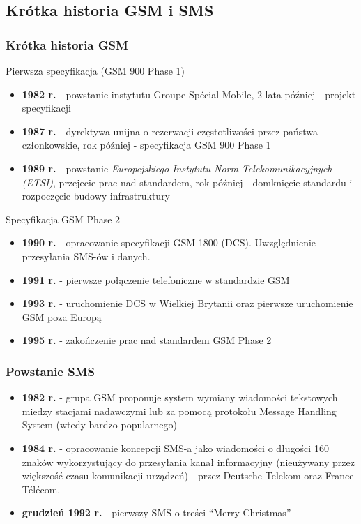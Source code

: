 \documentclass[xcolor=table]{beamer}
\begin{document}
\subsection{Krótka historia GSM i SMS}
\begin{frame}[allowframebreaks]
  \frametitle{Krótka historia GSM}

  Pierwsza specyfikacja (GSM 900 Phase 1)
  \begin{itemize}
    \item \textbf{1982 r.} - powstanie instytutu Groupe Spécial Mobile, 2 lata
      później - projekt specyfikacji
    \item \textbf{1987 r.} - dyrektywa unijna o rezerwacji częstotliwości przez
      państwa członkowskie, rok później - specyfikacja GSM 900 Phase 1
    \item \textbf{1989 r.} - powstanie \emph{Europejskiego Instytutu Norm
      Telekomunikacyjnych (ETSI)}, przejecie prac nad standardem, rok później -
      domknięcie standardu i rozpoczęcie budowy infrastruktury
  \end{itemize}

  \framebreak

  Specyfikacja GSM Phase 2
  \begin{itemize}
    \item \textbf{1990 r.} - opracowanie specyfikacji GSM 1800 (DCS).
      Uwzględnienie przesyłania SMS-ów i danych.
    \item \textbf{1991 r.} - pierwsze połączenie telefoniczne w standardzie GSM
    \item \textbf{1993 r.} - uruchomienie DCS w Wielkiej Brytanii oraz pierwsze
      uruchomienie GSM poza Europą
    \item \textbf{1995 r.} - zakończenie prac nad standardem GSM Phase 2
  \end{itemize}
\end{frame}


\begin{frame}
  \frametitle{Powstanie SMS}

  \begin{itemize}
    \item \textbf{1982 r.} - grupa GSM proponuje system wymiany wiadomości
      tekstowych miedzy stacjami nadawczymi lub za pomocą protokołu Message
      Handling System (wtedy bardzo popularnego)
    \item \textbf{1984 r.} - opracowanie koncepcji SMS-a jako wiadomości o
      długości 160 znaków wykorzystujący do przesyłania kanał informacyjny
      (nieużywany przez większość czasu komunikacji urządzeń) - przez Deutsche
      Telekom oraz France Télécom.
    \item \textbf{grudzień 1992 r.} - pierwszy SMS o treści ``Merry
      Christmas''
  \end{itemize}
\end{frame}
\end{document}

